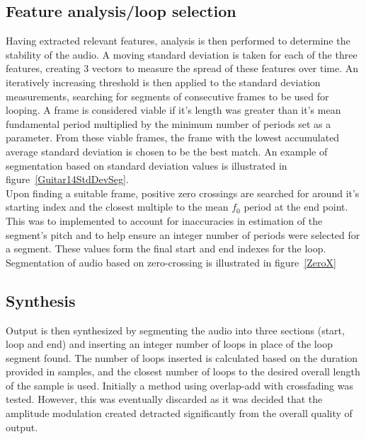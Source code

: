 \documentclass[titlepage]{scrartcl}
\begin{document}
\subsection{Feature analysis/loop selection}
Having extracted relevant features, analysis is then performed to determine the
stability of the audio.  A moving standard deviation is taken for each of the
three features, creating 3 vectors to measure the spread of these features over
time.  An iteratively increasing threshold is then applied to the standard
deviation measurements, searching for segments of consecutive frames to be used
for looping. A frame is considered viable if it's length was greater than it's
mean fundamental period multiplied by the minimum number of periods set as a
parameter. From these viable frames, the frame with the lowest accumulated
average standard deviation is chosen to be the best match. An example of
segmentation based on standard deviation values is illustrated in
figure~\ref{Guitar14StdDevSeg}.\\
Upon finding a suitable frame, positive zero crossings are searched for around
it's starting index and the closest multiple to the mean $f_0$ period at the end
point. This was to implemented to account for inaccuracies in estimation of the
segment's pitch and to help ensure an integer number of periods were selected
for a segment. These values form the final start and end indexes for the loop.
Segmentation of audio based on zero-crossing is illustrated in
figure~\ref{ZeroX}

\subsection{Synthesis}
Output is then synthesized by segmenting the audio into three sections (start,
loop and end) and inserting an integer number of loops in place of
the loop segment found. The number of loops inserted is calculated based on the
duration provided in samples, and the closest number of loops to the desired
overall length of the sample is used.
Initially a method using overlap-add with crossfading was tested. However, this
was eventually discarded as it was decided that the amplitude modulation
created detracted significantly from the overall quality of output.
\end{document}
